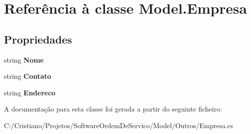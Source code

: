 \hypertarget{class_model_1_1_empresa}{}\section{Referência à classe Model.\+Empresa}
\label{class_model_1_1_empresa}
\subsection*{Propriedades}
\begin{DoxyCompactItemize}
\item 
\hypertarget{class_model_1_1_empresa_aae66f8756499e077ba0c4d747b8c64b6}{}string {\bfseries Nome}\label{class_model_1_1_empresa_aae66f8756499e077ba0c4d747b8c64b6}

\item 
\hypertarget{class_model_1_1_empresa_ab6261cad3b20d63939fdb2eb15f13367}{}string {\bfseries Contato}\label{class_model_1_1_empresa_ab6261cad3b20d63939fdb2eb15f13367}

\item 
\hypertarget{class_model_1_1_empresa_a1e5bd857fc1aeac4706badd53debddd9}{}string {\bfseries Endereco}\label{class_model_1_1_empresa_a1e5bd857fc1aeac4706badd53debddd9}

\end{DoxyCompactItemize}


A documentação para esta classe foi gerada a partir do seguinte ficheiro\+:\begin{DoxyCompactItemize}
\item 
C\+:/\+Cristiano/\+Projetos/\+Software\+Ordem\+De\+Servico/\+Model/\+Outros/Empresa.\+cs\end{DoxyCompactItemize}
